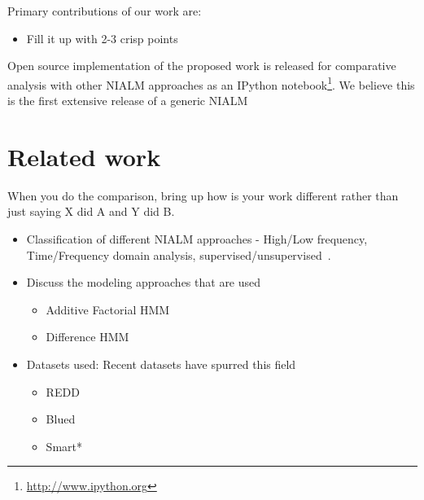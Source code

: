 \documentclass[conference]{IEEEtran}
\begin{document}
Primary contributions of our work are:
\begin{itemize}
\item Fill it up with 2-3 crisp points
\end{itemize}
Open source implementation of the proposed work is released for comparative analysis with other NIALM approaches as an IPython notebook\footnote{\url{http://www.ipython.org}}. We believe this is the first extensive release of a generic NIALM

\section{Related work}
When you do the comparison, bring up how is your work different rather than just saying X did A and Y did B.
\begin{itemize}
\item Classification of different NIALM approaches - High/Low frequency, Time/Frequency domain analysis, supervised/unsupervised~\cite{survey1,survey2,survey3}.

\item Discuss the modeling approaches that are used
\begin{itemize}
\item Additive Factorial HMM
\item Difference HMM \cite{parson2012_aaai}
\end{itemize}

\item Datasets used: Recent datasets have spurred this field
\begin{itemize}
\item REDD \cite{redd}
\item Blued \cite{blued_cmu}
\item Smart* \cite{smart}
\end{itemize}

\end{itemize}



%
%
\end{document}
